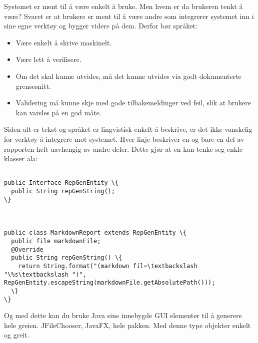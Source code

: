 \documentclass[11pt]{article}
\begin{document}
Systemet er ment til å være enkelt å bruke. Men hvem er da brukeren tenkt å være?
Svaret er at brukere er ment til å være andre som integrerer systemet inn i sine egne verktøy og bygger videre på dem.
Derfor bør språket:




\begin{itemize}
\item Være enkelt å skrive maskinelt.
\item Være lett å verifisere.
\item Om det skal kunne utvides, må det kunne utvides via godt dokumenterte grensesnitt.
\item Validering må kunne skje med gode tilbakemeldinger ved feil, slik at brukere kan varsles på en god måte.
\end{itemize}




Siden alt er tekst og språket er lingvistisk enkelt å beskrive, er det ikke vanskelig for verktøy å integrere mot systemet.
Hver linje beskriver en og bare en del av rapporten helt uavhengig av andre deler. Dette gjør at en kan tenke seg enkle klasser ala:




\begin{lstlisting}

public Interface RepGenEntity \{
  public String repGenString();
\}



public class MarkdownReport extends RepGenEntity \{
  public file markdownFile;
  @Override
  public String repGenString() \{
    return String.format("(markdown fil=\textbackslash "\%s\textbackslash ")", RepGenEntity.escapeString(markdownFile.getAbsolutePath()));
  \}
\}
\end{lstlisting}




Og med dette kan du bruke Java sine innebygde GUI elementer til å generere hele greien. JFileChooser, JavaFX, hele pakken. Med denne type objekter enkelt og greit.
\end{document}

